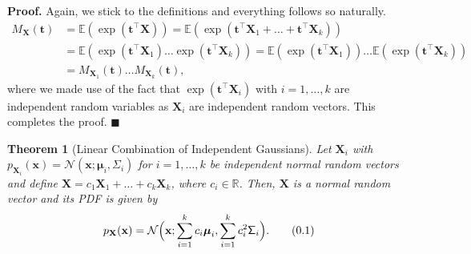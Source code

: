 \documentclass[10pt]{article}
\newtheorem{thm}{Theorem}[section]
\theoremstyle{definition}
\newenvironment{prf}{\noindent\textbf{Proof.}}{\hfill$\blacksquare$}
\newcommand\eqnum{\addtocounter{equation}{1}\tag{\arabic{section}.\arabic{equation}}}
\begin{document}
\begin{prf}
Again, we stick to the definitions and everything follows so naturally.
\begin{align*}
M_{\mathbf{X}}(\mathbf{t}) &= \mathbb{E}(\exp(\mathbf{t}^{\top}\mathbf{X}))
= \mathbb{E}(\exp(\mathbf{t}^{\top}\mathbf{X}_1+\dots+\mathbf{t}^{\top}\mathbf{X}_k)) \\
&= \mathbb{E}(\exp(\mathbf{t}^{\top}\mathbf{X}_1)\dots\exp(\mathbf{t}^{\top}\mathbf{X}_k))
= \mathbb{E}(\exp(\mathbf{t}^{\top}\mathbf{X}_1))\dots\mathbb{E}(\exp(\mathbf{t}^{\top}\mathbf{X}_k)) \\
&= M_{\mathbf{X}_1}(\mathbf{t}) \dots M_{\mathbf{X}_k}(\mathbf{t}),
\end{align*}
where we made use of the fact that $\exp(\mathbf{t}^{\top}\mathbf{X}_i)$ with $i=1,\dots,k$ are independent random variables as $\mathbf{X}_i$ are independent random vectors. This completes the proof.
\end{prf}
\begin{thm}[Linear Combination of Independent Gaussians]\label{thm:MVN:LC}
Let $\mathbf{X}_i$ with $p_{\mathbf{X}_i}(\mathbf{x})=\mathcal{N}(\mathbf{x}; \boldsymbol{\mu}_i, \mathsf{\Sigma}_i)$  for $i=1,\dots,k$ be independent normal random vectors and define $\mathbf{X}=c_1\mathbf{X}_1+\dots+c_k\mathbf{X}_k$, where $c_i\in\mathbb{R}$. Then, $\mathbf{X}$ is a normal random vector and its PDF is given by
\begin{equation*}
p_{\mathbf{X}}(\mathbf{x}) = \mathcal{N}\Big(\mathbf{x}; \sum_{i=1}^{k}c_i\boldsymbol{\mu}_i, \sum_{i=1}^{k}c_i^2\mathsf{\Sigma}_i\Big).
\eqnum
\label{eq:MVN:LC}
\end{equation*}
\end{thm}
\end{document}
